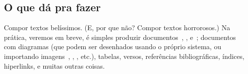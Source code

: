 \subsection{O que dá pra fazer}

Compor textos belíssimos. (E, por que não? Compor textos horrorosos.) Na
prática, veremos em breve, é simples produzir
documentos~, , e~; documentos
com diagramas (que podem ser desenhados usando o próprio sistema, ou
importando imagens~, , ,
etc.), tabelas, versos, referências bibliográficas, índices,
hiperlinks, e muitas outras coisas.

